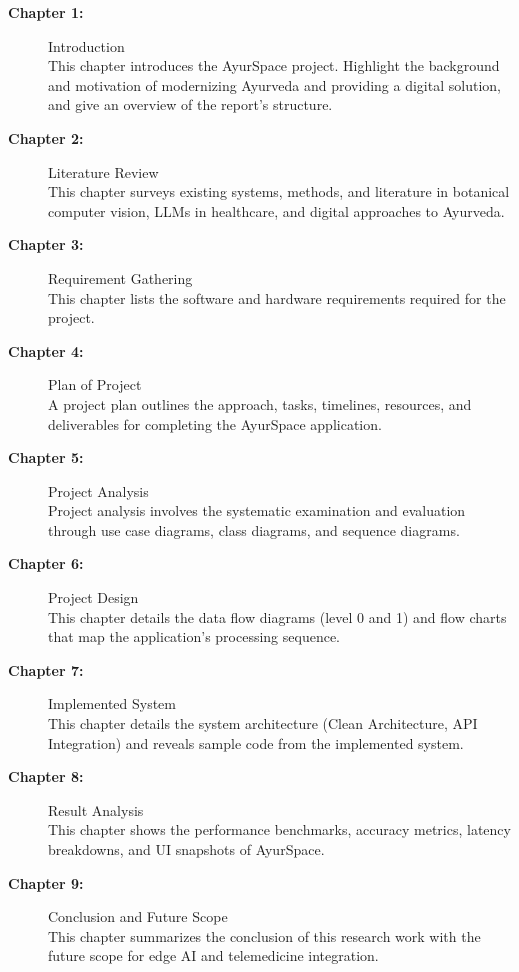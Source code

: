 \begin{description}
    \item[\textbf{Chapter 1:}] Introduction\\
    This chapter introduces the AyurSpace project. Highlight the background and motivation
    of modernizing Ayurveda and providing a digital solution, and give an overview of the
    report's structure.

    \item[\textbf{Chapter 2:}] Literature Review\\
    This chapter surveys existing systems, methods, and literature in botanical computer
    vision, LLMs in healthcare, and digital approaches to Ayurveda.

    \item[\textbf{Chapter 3:}] Requirement Gathering\\
    This chapter lists the software and hardware requirements required for the project.

    \item[\textbf{Chapter 4:}] Plan of Project\\
    A project plan outlines the approach, tasks, timelines, resources, and deliverables
    for completing the AyurSpace application.

    \item[\textbf{Chapter 5:}] Project Analysis\\
    Project analysis involves the systematic examination and evaluation through use case
    diagrams, class diagrams, and sequence diagrams.

    \item[\textbf{Chapter 6:}] Project Design\\
    This chapter details the data flow diagrams (level 0 and 1) and flow charts that map
    the application's processing sequence.

    \item[\textbf{Chapter 7:}] Implemented System\\
    This chapter details the system architecture (Clean Architecture, API Integration) and
    reveals sample code from the implemented system.

    \item[\textbf{Chapter 8:}] Result Analysis\\
    This chapter shows the performance benchmarks, accuracy metrics, latency breakdowns,
    and UI snapshots of AyurSpace.

    \item[\textbf{Chapter 9:}] Conclusion and Future Scope\\
    This chapter summarizes the conclusion of this research work with the future scope for
    edge AI and telemedicine integration.
\end{description}
